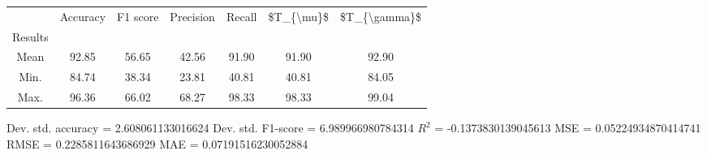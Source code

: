 \begin{tabular}{|c|c|c|c|c|c|c|}
\toprule
{} &  Accuracy &  F1 score &  Precision &  Recall &  \$T\_\{\textbackslash mu\}\$ &  \$T\_\{\textbackslash gamma\}\$ \\
Results &           &           &            &         &            &               \\
\hline
Mean    &     92.85 &     56.65 &      42.56 &   91.90 &      91.90 &         92.90 \\
Min.    &     84.74 &     38.34 &      23.81 &   40.81 &      40.81 &         84.05 \\
Max.    &     96.36 &     66.02 &      68.27 &   98.33 &      98.33 &         99.04 \\
\bottomrule
\end{tabular}

 Dev. std. accuracy = 2.608061133016624
 Dev. std. F1-score = 6.989966980784314
 $R^2$ = -0.1373830139045613
 MSE = 0.05224934870414741
 RMSE = 0.2285811643686929
 MAE = 0.07191516230052884